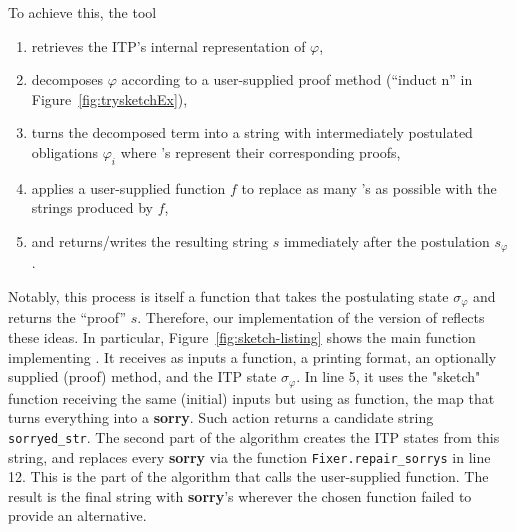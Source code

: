 \documentclass[10pt,conference]{IEEEtran}
\newcommand{\isakw}[1]{{\bfseries\ttfamily\def\isachardot{.}\def\isacharunderscore{\isacharunderscorekeyword}%
\def\isacharbraceleft{\{}\def\isacharbraceright{\}}#1}}
\renewcommand{\isacommand}[1]{\textcolor{IsaBlue}{\isakw{#1}}}
\begin{document}
To achieve this, the \supersketch{} tool 
\begin{enumerate}
    \item retrieves the ITP's internal representation of $\varphi$,
    \item decomposes $\varphi$ according to a user-supplied proof method (``induct n'' in Figure~\ref{fig:trysketchEx}),
    \item turns the decomposed term into a string with intermediately postulated obligations $\varphi_i$ where \isa{\isacommand{sorry}}'s represent their corresponding proofs,
    \item applies a user-supplied \frameterm function $f$ to replace as many \isa{\isacommand{sorry}}'s as possible with the strings produced by $f$,
    \item and returns/writes the resulting string $s$ immediately after the postulation $s_\varphi$.
\end{enumerate}

Notably, this process is itself a \frameterm function that takes the postulating state $\sigma_\varphi$ and returns the ``proof'' $s$. Therefore, our implementation of the \trysketch{} version of \supersketch{} reflects these ideas. In particular, Figure~\ref{fig:sketch-listing} shows the main function implementing \trysketch{}. It receives as inputs a \frameterm function, a printing format, an optionally supplied (proof) method, and the ITP state $\sigma_\varphi$. In line 5, it uses the "sketch" \frameterm function receiving the same (initial) inputs but using as \frameterm function, the map that turns everything into a \isacommand{sorry}. Such action returns a candidate string \texttt{sorryed\_str}. The second part of the algorithm creates the ITP states from this string, and replaces every \isacommand{sorry} via the function \texttt{Fixer.repair\_sorrys} in line 12. This is the part of the algorithm that calls the user-supplied \frameterm function. The result is the final string with \isacommand{sorry}'s wherever the chosen \frameterm function failed to provide an alternative.
\end{document}

